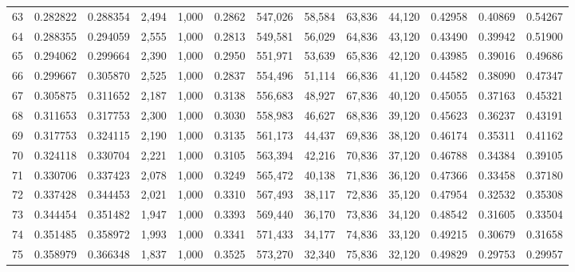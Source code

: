 \begin{tabular}{rrrrrrrrrrrrr}
63  &  0.282822 &  0.288354 &   2,494 &  1,000 &                                     0.2862 &  547,026 &   58,584 &   63,836 &   44,120 &  0.42958 &  0.40869 &  0.54267 \\
64  &  0.288355 &  0.294059 &   2,555 &  1,000 &                                     0.2813 &  549,581 &   56,029 &   64,836 &   43,120 &  0.43490 &  0.39942 &  0.51900 \\
65  &  0.294062 &  0.299664 &   2,390 &  1,000 &                                     0.2950 &  551,971 &   53,639 &   65,836 &   42,120 &  0.43985 &  0.39016 &  0.49686 \\
66  &  0.299667 &  0.305870 &   2,525 &  1,000 &                                     0.2837 &  554,496 &   51,114 &   66,836 &   41,120 &  0.44582 &  0.38090 &  0.47347 \\
67  &  0.305875 &  0.311652 &   2,187 &  1,000 &                                     0.3138 &  556,683 &   48,927 &   67,836 &   40,120 &  0.45055 &  0.37163 &  0.45321 \\
68  &  0.311653 &  0.317753 &   2,300 &  1,000 &                                     0.3030 &  558,983 &   46,627 &   68,836 &   39,120 &  0.45623 &  0.36237 &  0.43191 \\
69  &  0.317753 &  0.324115 &   2,190 &  1,000 &                                     0.3135 &  561,173 &   44,437 &   69,836 &   38,120 &  0.46174 &  0.35311 &  0.41162 \\
70  &  0.324118 &  0.330704 &   2,221 &  1,000 &                                     0.3105 &  563,394 &   42,216 &   70,836 &   37,120 &  0.46788 &  0.34384 &  0.39105 \\
71  &  0.330706 &  0.337423 &   2,078 &  1,000 &                                     0.3249 &  565,472 &   40,138 &   71,836 &   36,120 &  0.47366 &  0.33458 &  0.37180 \\
72  &  0.337428 &  0.344453 &   2,021 &  1,000 &                                     0.3310 &  567,493 &   38,117 &   72,836 &   35,120 &  0.47954 &  0.32532 &  0.35308 \\
73  &  0.344454 &  0.351482 &   1,947 &  1,000 &                                     0.3393 &  569,440 &   36,170 &   73,836 &   34,120 &  0.48542 &  0.31605 &  0.33504 \\
74  &  0.351485 &  0.358972 &   1,993 &  1,000 &                                     0.3341 &  571,433 &   34,177 &   74,836 &   33,120 &  0.49215 &  0.30679 &  0.31658 \\
75  &  0.358979 &  0.366348 &   1,837 &  1,000 &                                     0.3525 &  573,270 &   32,340 &   75,836 &   32,120 &  0.49829 &  0.29753 &  0.29957 \\

\end{tabular}
